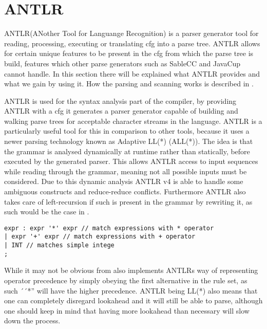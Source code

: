 \section{ANTLR}
ANTLR(ANother Tool for Languange Recognition) is a parser generator tool for reading, processing, executing or translating \gls{cfg} into a parse tree.
ANTLR allows for certain unique features to be present in the \gls{cfg} from which the parse tree is build, features which other parse generators such as SableCC and JavaCup cannot handle. %
In this section there will be explained what ANTLR provides and what we gain by using it.
How the parsing and scanning works is described in .

ANTLR is used for the syntax analysis part of the compiler, by providing ANTLR with a \gls{cfg} it generates a parser generator capable of building and walking parse trees for acceptable character streams in the language.
ANTLR is a particularly useful tool for this in comparison to other tools, because it uses a newer parsing technology known as Adaptive LL(*) (ALL(*)).
The idea is that the grammar is analysed dynamically at runtime rather than statically, before executed by the generated parser.
This allows ANTLR access to input sequences while reading through the grammar, meaning not all possible inputs must be considered.
Due to this dynamic analysis ANTLR v4 is able to handle some ambiguous constructs and reduce-reduce conflicts.
Furthermore ANTLR also takes care of left-recursion if such is present in the grammar by rewriting it, as such would be the case in .

\begin{lstlisting}[caption=An ambiguous rule for expr,frame=tlrb,label={lst:amb}]
expr : expr '*' expr // match expressions with * operator
| expr '+' expr // match expressions with + operator
| INT // matches simple intege
;
\end{lstlisting}
While it may not be obvious from  also implements ANTLRs way of representing operator precedence by simply obeying the first alternative in the rule set, as such ´´*'' will have the higher precedence.
ANTLR being LL(*) also means that one can completely disregard lookahead and it will still be able to parse, although one should keep in mind that having more lookahead than necessary will slow down the process.\citep{ANTLR4}

